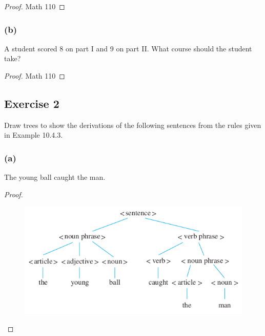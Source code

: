\documentclass[14pt]{extarticle}
\begin{document}
\begin{proof}
Math 110
\end{proof}

\subsubsection{(b)}
A student scored 8 on part I and 9 on part II. What course should the student take?

\begin{proof}
Math 110
\end{proof}

\subsection{Exercise 2}
Draw trees to show the derivations of the following sentences from the rules given in Example 10.4.3.

\subsubsection{(a)}
The young ball caught the man.
\begin{proof}
\begin{figure}[ht!]
\centering
\includegraphics[scale=0.5]{../images/10.4.2.a.png}
\end{figure}
\end{proof}
\end{document}
